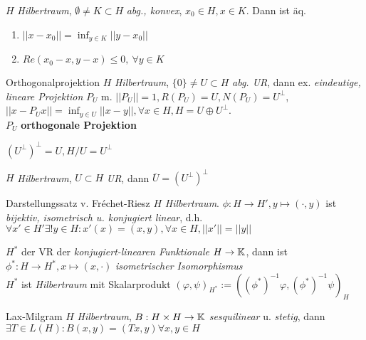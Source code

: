 \begin{lemma}
  $H$ \textit{Hilbertraum}, $\emptyset \neq K\subset H$ \textit{abg., konvex},
  $x_0 \in H, x\in K$. Dann ist äq.
  \begin{enumerate}[label = (\roman*)]
    \item $||x-x_0|| = \inf_{y\in K}||y-x_0||$
    \item $Re(x_0-x,y-x) \leq 0,\ \forall y\in K$
  \end{enumerate}
\end{lemma}

\begin{satz}{Orthogonalprojektion}
  $H$ \textit{Hilbertraum}, $\{0\} \neq U \subset H$ \textit{abg. UR}, dann
  ex. \textit{eindeutige, lineare Projektion} $P_U$ m. $||P_U|| = 1, R(P_U) = U,
  N(P_U)=U^\perp$,\\
  $||x-P_Ux|| = \inf_{y\in U}||x-y||, \forall x\in H, H = U \oplus U^\perp$.\\
  $P_U$ \textbf{orthogonale Projektion}
\end{satz}

\begin{bemerkung}
  $(U^\perp)^\perp = U, H/U = U^\perp$
\end{bemerkung}

\begin{korrolar}
  $H$ \textit{Hilbertraum}, $U\subset H$ \textit{UR},
  dann $\overline{U} = (U^\perp)^\perp$
\end{korrolar}

\begin{satz}{Darstellungssatz v. Fréchet-Riesz}
  $H$ \textit{Hilbertraum}. $\phi:H \to H', y \mapsto (\cdot,y)$ ist
  \textit{bijektiv, isometrisch u. konjugiert linear}, d.h.
  $\forall x' \in H' \exists ! y \in H: x'(x) = (x,y), \forall x \in H,
  ||x'|| = ||y||$
\end{satz}

\begin{bemerkung}
  $H^*$ der VR der \textit{konjugiert-linearen Funktionale} $H\to \mathbb{K}$,
  dann ist $\phi^*:H \to H^*, x\mapsto (x,\cdot)$ \textit{isometrischer
  Isomorphismus}\\
  $H^*$ ist \textit{Hilbertraum} mit Skalarprodukt $(\varphi, \psi)_{H^*} :=
  ((\phi^*)^{-1}\varphi,(\phi^*)^{-1}\psi )_H$
\end{bemerkung}

\begin{satz}{Lax-Milgram}
  $H$ \textit{Hilbertraum}, $B:H \times H \to \mathbb{K}$ \textit{sesquilinear} u.
  \textit{stetig}, dann $\exists T \in L(H):B(x,y)=(Tx,y) \forall x,y \in H$
\end{satz}
